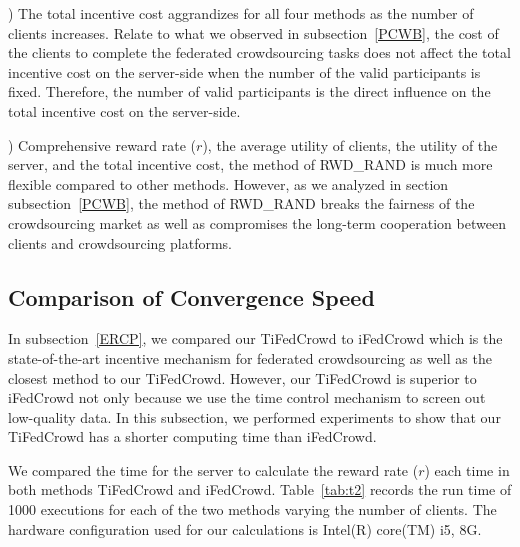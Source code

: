 \documentclass[final,1p,times]{elsarticle}
\begin{document}
 \lowercase{}) The total incentive cost aggrandizes for all four methods as the number of clients increases. Relate to what we observed in subsection~\ref{PCWB}, the cost of the clients to complete the federated crowdsourcing tasks does not affect the total incentive cost on the server-side when the number of the valid participants is fixed. Therefore, the number of valid participants is the direct influence on the total incentive cost on the server-side.

 \lowercase{}) Comprehensive reward rate ($r$), the average utility of clients, the utility of the server, and the total incentive cost, the method of RWD\_RAND is much more flexible compared to other methods. However, as we analyzed in section subsection~\ref{PCWB}, the method of RWD\_RAND breaks the fairness of the crowdsourcing market as well as compromises the long-term cooperation between clients and crowdsourcing platforms.

\subsection{Comparison of Convergence Speed} \label{CTCT}
In subsection~\ref{ERCP}, we compared our TiFedCrowd to iFedCrowd \citep{kang2022incentive} which is the state-of-the-art incentive mechanism for federated crowdsourcing as well as the closest method to our TiFedCrowd. However, our TiFedCrowd is superior to iFedCrowd not only because we use the time control mechanism to screen out low-quality data. In this subsection, we performed experiments to show that our TiFedCrowd has a shorter computing time than iFedCrowd. 

We compared the time for the server to calculate the reward rate ($r$) each time in both methods TiFedCrowd and iFedCrowd. Table~\ref{tab:t2} records the run time of 1000 executions for each of the two methods varying the number of clients. The hardware configuration used for our calculations is Intel(R) core(TM) i5, 8G.

\begin{table}
	\caption{The time (the measuring unit: second) for the server to calculate the reward rate ($r$)}
	\centering
	\label{tab:t2}
\end{table}
\end{document}
